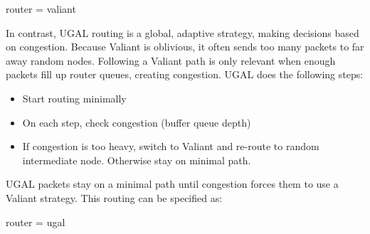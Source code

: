 \begin{ViFile}
router = valiant
\end{ViFile}

In contrast, UGAL routing is a global, adaptive strategy, making decisions based on congestion.
Because Valiant is oblivious, it often sends too many packets to far away random nodes.
Following a Valiant path is only relevant when enough packets fill up router queues, creating congestion.
UGAL does the following steps:
\begin{itemize}
\item Start routing minimally
\item On each step, check congestion (buffer queue depth)
\item If congestion is too heavy, switch to Valiant and re-route to random intermediate node. Otherwise stay on minimal path.
\end{itemize}
UGAL packets stay on a minimal path until congestion forces them to use a Valiant strategy.
This routing can be specified as:

\begin{ViFile}
router = ugal
\end{ViFile}

